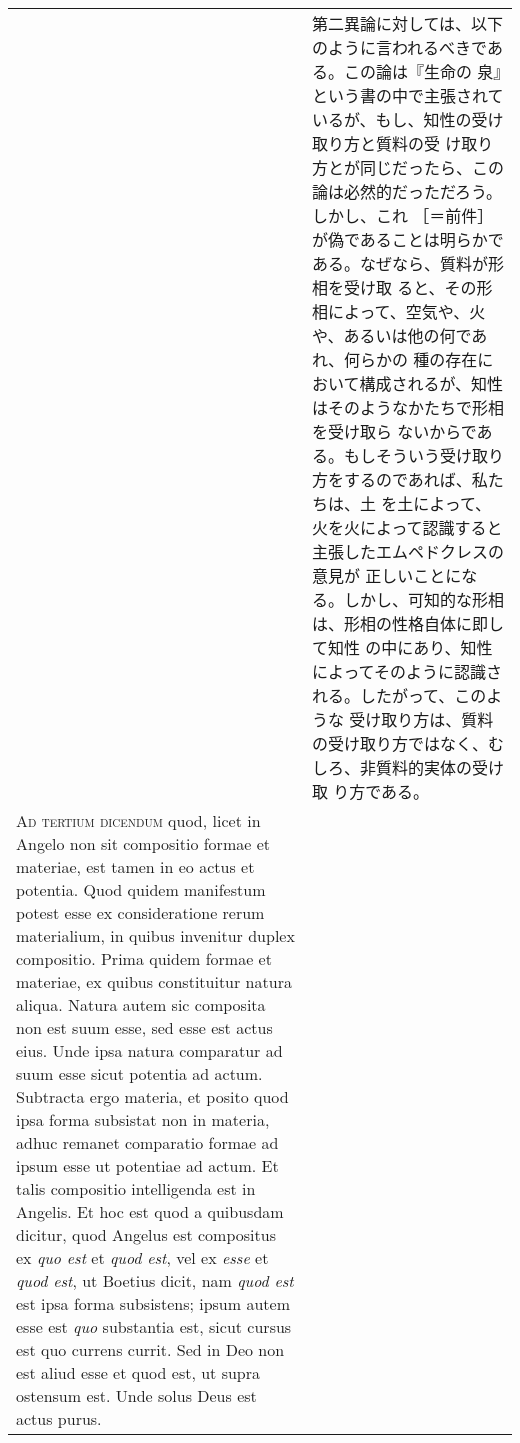\documentclass[10pt]{jsarticle} %
\begin{document}
\begin{longtable}{p{21em}p{21em}}
&

 第二異論に対しては、以下のように言われるべきである。この論は『生命の
 泉』という書の中で主張されているが、もし、知性の受け取り方と質料の受
 け取り方とが同じだったら、この論は必然的だっただろう。しかし、これ
 ［＝前件］が偽であることは明らかである。なぜなら、質料が形相を受け取
 ると、その形相によって、空気や、火や、あるいは他の何であれ、何らかの
 種の存在において構成されるが、知性はそのようなかたちで形相を受け取ら
 ないからである。もしそういう受け取り方をするのであれば、私たちは、土
 を土によって、火を火によって認識すると主張したエムペドクレスの意見が
 正しいことになる。しかし、可知的な形相は、形相の性格自体に即して知性
 の中にあり、知性によってそのように認識される。したがって、このような
 受け取り方は、質料の受け取り方ではなく、むしろ、非質料的実体の受け取
 り方である。


\\

{\scshape Ad tertium dicendum} quod, licet in Angelo non sit
compositio formae et materiae, est tamen in eo actus et potentia. Quod
quidem manifestum potest esse ex consideratione rerum materialium, in
quibus invenitur duplex compositio. Prima quidem formae et materiae,
ex quibus constituitur natura aliqua. Natura autem sic composita non
est suum esse, sed esse est actus eius. Unde ipsa natura comparatur ad
suum esse sicut potentia ad actum. Subtracta ergo materia, et posito
quod ipsa forma subsistat non in materia, adhuc remanet comparatio
formae ad ipsum esse ut potentiae ad actum. Et talis compositio
intelligenda est in Angelis. Et hoc est quod a quibusdam dicitur, quod
Angelus est compositus ex {\itshape quo est} et {\itshape quod est},
vel ex {\itshape esse} et {\itshape quod est}, ut Boetius dicit, nam
{\itshape quod est} est ipsa forma subsistens; ipsum autem esse est
{\itshape quo} substantia est, sicut cursus est quo currens
currit. Sed in Deo non est aliud esse et quod est, ut supra ostensum
est. Unde solus Deus est actus purus.


 &


\end{longtable}
\end{document}
